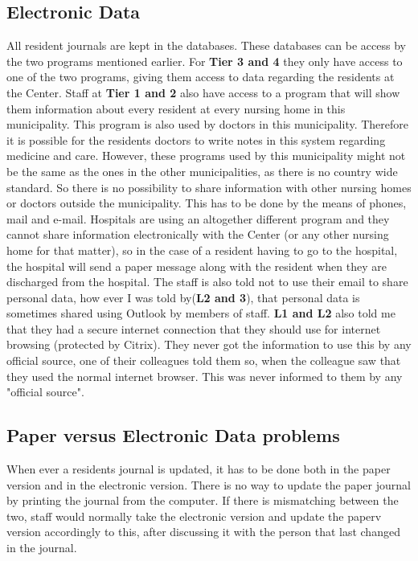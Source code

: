 \documentclass[11pt]{article}
\begin{document}
\subsection{Electronic Data}
All resident journals are kept in the databases. These databases can be access by the two programs mentioned earlier. For \textbf{Tier 3 and 4} they only have access to one of the two programs, giving them access to data regarding the residents at the Center. Staff at \textbf{Tier 1 and 2} also have access to a program that will show them information about every resident at every nursing home in this municipality. This program is also used by doctors in this municipality. Therefore it is possible for the residents doctors to write notes in this system regarding medicine and care.
However, these programs used by this municipality might not be the same as the ones in the other municipalities, as there is no country wide standard. So there is no possibility to share information with other nursing homes or doctors outside the municipality. This has to be done by the means of phones, mail and e-mail. 
Hospitals are using an altogether different program and they cannot share information electronically with the Center (or any other nursing home for that matter), so in the case of a resident having to go to the hospital, the hospital will send a paper message along with the resident when they are discharged from the hospital. 
The staff is also told not to use their email to share personal data, how ever I was told by(\textbf{L2 and 3}), that personal data is sometimes shared using Outlook by members of staff.
\textbf{L1 and L2} also told me that they had a secure internet connection that they should use for internet browsing (protected by Citrix). They never got the information to use this by any official source, one of their colleagues told them so, when the colleague saw that they used the normal internet browser. This was never informed to them by any "official source".
\subsection{Paper versus Electronic Data problems}
When ever a residents journal is updated, it has to be done both in the paper version and in the electronic version. There is no way to update the paper journal by printing the journal from the computer.
If there is mismatching between the two, staff would normally take the electronic version and update the paperv version accordingly to this, after discussing it with the person that last changed in the journal.
\end{document}
